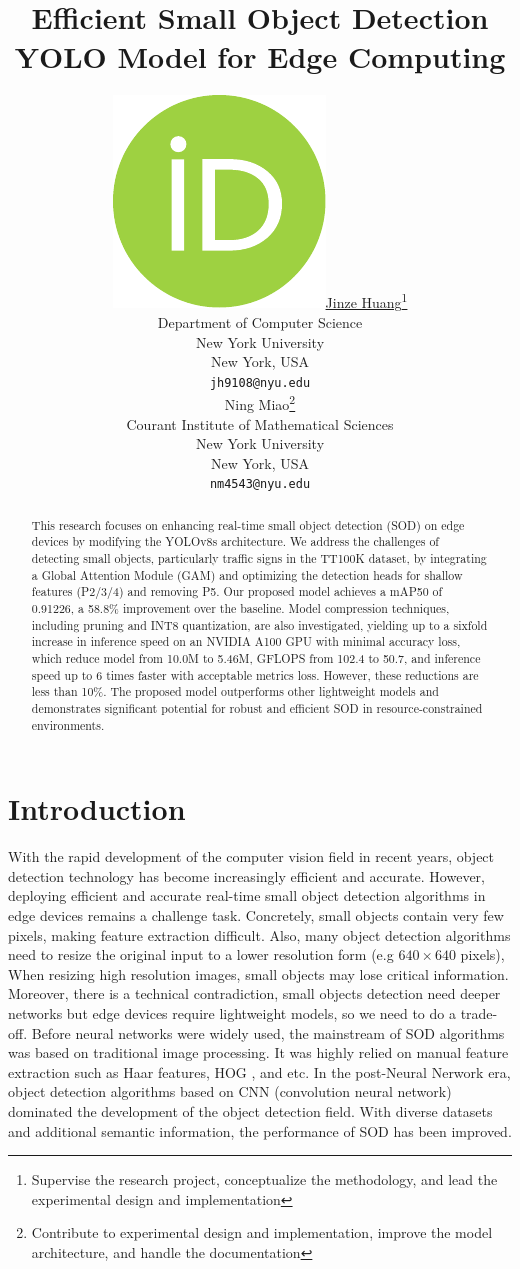 \documentclass[10pt]{article}
\title{Efficient Small Object Detection YOLO Model for Edge Computing}
\author{
    \href{https://orcid.org/0009-0000-4164-8952}{\protect\noindent\includegraphics[scale=0.06]{orcid.pdf}\hspace{1mm}Jinze Huang}\thanks{Supervise the research project, conceptualize the methodology, and lead the experimental design and implementation}\\
    Department of Computer Science\\
    New York University\\
    New York, USA\\
    \texttt{jh9108@nyu.edu}\\
    \And
    Ning Miao\thanks{Contribute to experimental design and implementation, improve the model architecture, and handle the documentation}\\
    Courant Institute of Mathematical Sciences\\
    New York University\\
    New York, USA\\
    \texttt{nm4543@nyu.edu}
}
\date{}
\begin{document}
\maketitle

\begin{abstract}
    This research focuses on enhancing real-time small object detection (SOD) on edge devices by modifying the YOLOv8s architecture. We address the challenges of detecting small objects, particularly traffic signs in the TT100K dataset, by integrating a Global Attention Module (GAM) and optimizing the detection heads for shallow features (P2/3/4) and removing P5. Our proposed model achieves a mAP50 of 0.91226, a 58.8\% improvement over the baseline. Model compression techniques, including pruning and INT8 quantization, are also investigated, yielding up to a sixfold increase in inference speed on an NVIDIA A100 GPU with minimal accuracy loss, which reduce model from 10.0M to 5.46M, GFLOPS from 102.4 to 50.7, and inference speed up to 6 times faster with acceptable metrics loss. However, these reductions are less than 10\%. The proposed model outperforms other lightweight models and demonstrates significant potential for robust and efficient SOD in resource-constrained environments.
\end{abstract}




\section{Introduction}
With the rapid development of the computer vision field in recent years, object detection technology has become increasingly efficient and accurate. However, deploying efficient and accurate real-time small object detection algorithms in edge devices remains a challenge task. Concretely, small objects contain very few pixels, making feature extraction difficult. Also, many object detection algorithms need to resize the original input to a lower resolution form (e.g $640 \times 640$ pixels), When resizing high resolution images, small objects may lose critical information. Moreover, there is a technical contradiction, small objects detection need deeper networks but edge devices require lightweight models, so we need to do a trade-off.
Before neural networks were widely used, the mainstream of SOD algorithms was based on traditional image processing. It was highly relied on manual feature extraction\cite{xiuling2024} such as Haar features, HOG \cite{dollar2009pedestrian}, and etc. In the post-Neural Nerwork era, object detection algorithms based on CNN (convolution neural network) dominated the development of the object detection field. With diverse datasets and additional semantic information, the performance of SOD has been improved.
\end{document}
